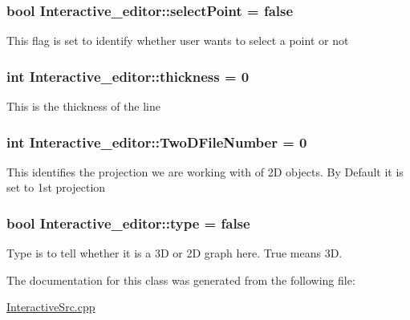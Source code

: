 \subsubsection[{\texorpdfstring{select\+Point}{selectPoint}}]{\setlength{\rightskip}{0pt plus 5cm}bool Interactive\+\_\+editor\+::select\+Point = false}\hypertarget{classInteractive__editor_ab0f07759c3ff1bcfe45d0c285abe29b5}{}\label{classInteractive__editor_ab0f07759c3ff1bcfe45d0c285abe29b5}
This flag is set to identify whether user wants to select a point or not 
\subsubsection[{\texorpdfstring{thickness}{thickness}}]{\setlength{\rightskip}{0pt plus 5cm}int Interactive\+\_\+editor\+::thickness = 0}\hypertarget{classInteractive__editor_a65f9bb481055109e9d52e2a6bc2db58e}{}\label{classInteractive__editor_a65f9bb481055109e9d52e2a6bc2db58e}
This is the thickness of the line 
\subsubsection[{\texorpdfstring{Two\+D\+File\+Number}{TwoDFileNumber}}]{\setlength{\rightskip}{0pt plus 5cm}int Interactive\+\_\+editor\+::\+Two\+D\+File\+Number = 0}\hypertarget{classInteractive__editor_a016e5e8e9a124977ab6048c90980be97}{}\label{classInteractive__editor_a016e5e8e9a124977ab6048c90980be97}
This identifies the projection we are working with of 2D objects. By Default it is set to 1st projection 
\subsubsection[{\texorpdfstring{type}{type}}]{\setlength{\rightskip}{0pt plus 5cm}bool Interactive\+\_\+editor\+::type = false}\hypertarget{classInteractive__editor_a93c2f2041e432c8047d51942345cc3f9}{}\label{classInteractive__editor_a93c2f2041e432c8047d51942345cc3f9}
Type is to tell whether it is a 3D or 2D graph here. True means 3D. 

The documentation for this class was generated from the following file\+:\begin{DoxyCompactItemize}
\item 
\hyperlink{InteractiveSrc_8cpp}{Interactive\+Src.\+cpp}\end{DoxyCompactItemize}
